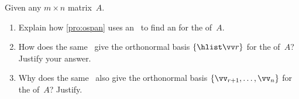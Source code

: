 \begin{exercise} \label{ex:ospanrcn} 
Given any \(m\times n\) matrix~\(A\).
\begin{enumerate}
\item Explain how \cref{pro:ospan} uses an \svd\ to find an  for the  of~\(A\).
\item How does the same \svd\ give the orthonormal basis \(\{\hlist\vv r\}\) for the  of~\(A\)?  Justify your answer.
\item Why does the same \svd\ also give the orthonormal basis \(\{\vv_{r+1},\ldots,\vv_n\}\) for the  of~\(A\)?  Justify.
\end{enumerate}
\end{exercise}




